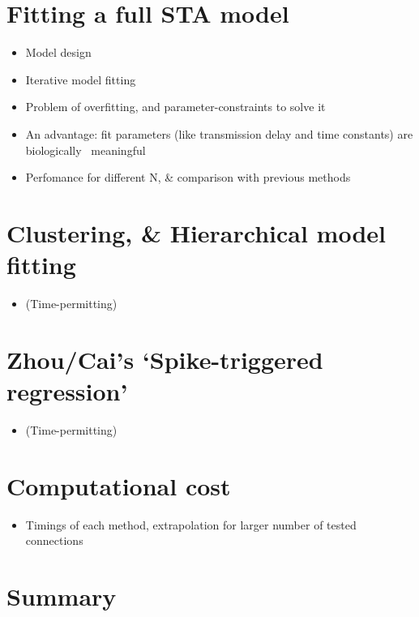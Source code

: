 \documentclass[a4paper, oneside, 11pt]{memoir}
\begin{document}
\section{Fitting a full STA model}

\begin{itemize}
    \item Model design
    \item Iterative model fitting
    \item Problem of overfitting, and parameter-constraints to solve it
    \item An advantage: fit parameters (like transmission delay and time constants) are biologically ~meaningful
    \item Perfomance for different N, \& comparison with previous methods
\end{itemize}



\section{Clustering, \& Hierarchical model fitting}

\begin{itemize}
    \item (Time-permitting)
\end{itemize}


\section{Zhou/Cai's `Spike-triggered regression'}

\begin{itemize}
    \item (Time-permitting)
\end{itemize}


\section{Computational cost}

\begin{itemize}
    \item Timings of each method, extrapolation for larger number of tested connections
\end{itemize}

\section{Summary}
\end{document}
